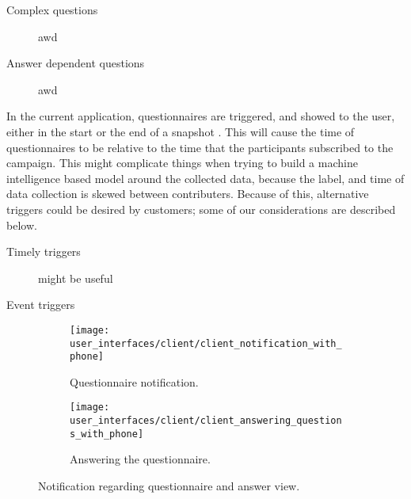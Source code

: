 \begin{description}
  	\item[Complex questions] awd

  	\item[Answer dependent questions] awd
\end{description}

In the current application, questionnaires are triggered, and showed to the user, either in the start or the end of a snapshot . This will cause the time of questionnaires to be relative to the time that the participants subscribed to the campaign. This might complicate things when trying to build a machine intelligence based model around the collected data, because the label, and time of data collection is skewed between contributers. Because of this, alternative triggers could be desired by customers; some of our considerations are described below.

\begin{description}
   	\item[Timely triggers] might be useful 

   	\item[Event triggers] 
\end{description}    

\begin{figure}[!htbp]
\begin{subfigure}[!t]{.50\textwidth}
  \centering
  \texttt{[image: user\_interfaces/client/client\_notification\_with\_phone]}
  \caption{Questionnaire notification.}
  \label{fig:answering_questionnaire_notification}
\end{subfigure}%
\begin{subfigure}[!t]{.50\textwidth}
  \centering
  \texttt{[image: user\_interfaces/client/client\_answering\_questions\_with\_phone]}
  \caption{Answering the questionnaire.}
  \label{fig:answering_questionnaire_answering}
\end{subfigure}
\caption{Notification regarding questionnaire and answer view.}
\label{fig:answering_questionnaire}
\end{figure}
\FloatBarrier
